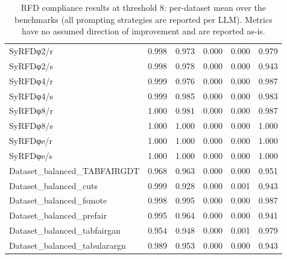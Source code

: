 \begin{table}[t]
\begin{tabular}{lrrrrr}
\midrule
SyRFDφ2/r & 0.998 & 0.973 & 0.000 & 0.000 & 0.979 \\
SyRFDφ2/s & 0.998 & 0.978 & 0.000 & 0.000 & 0.943 \\
SyRFDφ4/r & 0.999 & 0.976 & 0.000 & 0.000 & 0.987 \\
SyRFDφ4/s & 0.999 & 0.985 & 0.000 & 0.000 & 0.983 \\
SyRFDφ8/r & 1.000 & 0.981 & 0.000 & 0.000 & 0.987 \\
SyRFDφ8/s & 1.000 & 1.000 & 0.000 & 0.000 & 1.000 \\
SyRFDφe/r & 1.000 & 1.000 & 0.000 & 0.000 & 1.000 \\
SyRFDφe/s & 1.000 & 1.000 & 0.000 & 0.000 & 1.000 \\
\midrule
Dataset\_balanced\_TABFAIRGDT & 0.968 & 0.963 & 0.000 & 0.000 & 0.951 \\
Dataset\_balanced\_cuts & 0.999 & 0.928 & 0.000 & 0.001 & 0.943 \\
Dataset\_balanced\_fsmote & 0.998 & 0.995 & 0.000 & 0.000 & 0.987 \\
Dataset\_balanced\_prefair & 0.995 & 0.964 & 0.000 & 0.000 & 0.941 \\
Dataset\_balanced\_tabfairgan & 0.954 & 0.948 & 0.000 & 0.001 & 0.979 \\
Dataset\_balanced\_tabularargn & 0.989 & 0.953 & 0.000 & 0.000 & 0.943 \\
\bottomrule
\end{tabular}
\caption{RFD compliance results at threshold 8: per-dataset mean over the benchmarks (all prompting strategies are reported per LLM). Metrics have no assumed direction of improvement and are reported as-is.}
\label{tab:rfdcompliance_main_thr8}
\end{table}
